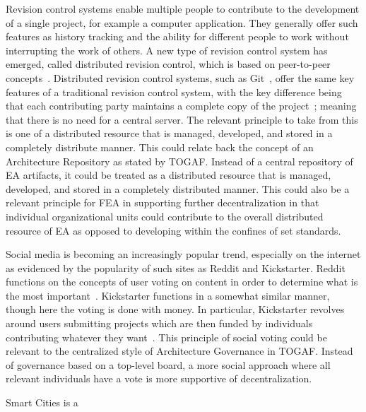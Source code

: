 Revision control systems enable multiple people to contribute to the development of a single project, for example a computer application. They generally offer such features as history tracking and the ability for different people to work without interrupting the work of others. A new type of revision control system has emerged, called distributed revision control, which is based on peer-to-peer concepts~\cite{O'Sullivan2009}. Distributed revision control systems, such as Git~\cite{SoftwareFreedomConservancy}, offer the same key features of a traditional revision control system, with the key difference being that each contributing party maintains a complete copy of the project~\cite{O'Sullivan2009}; meaning that there is no need for a central server. The relevant principle to take from this is one of a distributed resource that is managed, developed, and stored in a completely distribute manner. This could relate back the concept of an Architecture Repository as stated by TOGAF. Instead of a central repository of EA artifacts, it could be treated as a distributed resource that is managed, developed, and stored in a completely distributed manner. This could also be a relevant principle for FEA in supporting further decentralization in that individual organizational units could contribute to the overall distributed resource of EA as opposed to developing within the confines of set standards. 

Social media is becoming an increasingly popular trend, especially on the internet as evidenced by the popularity of such sites as Reddit and Kickstarter. Reddit functions on the concepts of user voting on content in order to determine what is the most important~\cite{RedditInc.}. Kickstarter functions in a somewhat similar manner, though here the voting is done with money. In particular, Kickstarter revolves around users submitting projects which are then funded by individuals contributing whatever they want~\cite{KickstarterInc.}. This principle of social voting could be relevant to the centralized style of Architecture Governance in TOGAF. Instead of governance based on a top-level board, a more social approach where all relevant individuals have a vote is more supportive of decentralization. 

Smart Cities is a 

